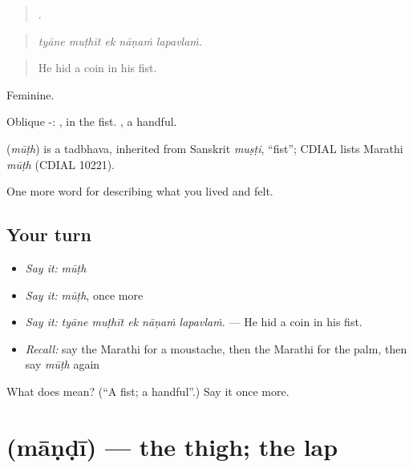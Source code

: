 \begin{quote}
    .
\end{quote}

\begin{quote}
\emph{tyāne muṭhīt ek nāṇaṁ lapavlaṁ.}
\end{quote}

\begin{quote}
He hid a coin in his fist.
\end{quote}

Feminine.

Oblique -: , in the fist. , a handful.

\begin{cousinweb}
\textbf{} (\emph{mūṭh}) is a tadbhava, inherited from Sanskrit \emph{muṣṭi}, \textquotedblleft{}fist\textquotedblright{}; CDIAL lists Marathi \emph{mūṭh} (CDIAL 10221).
\end{cousinweb}

\begin{grammarlens}[title={What you've built}]
One more word for describing what you lived and felt.
\end{grammarlens}

\subsection*{Your turn}
\begin{itemize}
\raggedright
  \item \emph{Say it:} \emph{mūṭh}
  \item \emph{Say it:} \emph{mūṭh}, once more
  \item \emph{Say it:} \emph{tyāne muṭhīt ek nāṇaṁ lapavlaṁ.} — He hid a coin in his fist.
  \item \emph{Recall:} say the Marathi for a moustache, then the Marathi for the palm, then say \emph{mūṭh} again
\end{itemize}

\begin{tcolorbox}[breakable,colback=teal!4,colframe=teal!35!black,title={Before you move on}]
What does  mean? (\textquotedblleft{}A fist; a handful\textquotedblright{}.) Say it once more.
\end{tcolorbox}
\section[\texorpdfstring{\mr{मांडी} (māṇḍī)}{मांडी (māṇḍī)}]{ (māṇḍī) — the thigh; the lap}

